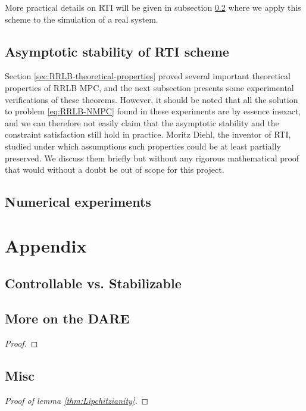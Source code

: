 \documentclass[12pt]{article}
\begin{document}
More practical details on RTI will be given in subsection \ref{sec:RRLB-numerical-experiments} where we apply this scheme to the simulation of a real system.

\subsection{Asymptotic stability of RTI scheme}\label{sec:RRLB-real-time-stability}

Section \ref{sec:RRLB-theoretical-properties} proved several important theoretical properties of RRLB MPC, and the next subsection presents some experimental verifications of these theorems.
However, it should be noted that all the solution to problem \ref{eq:RRLB-NMPC} found in these experiments are by essence inexact, and we can therefore not easily claim that the asymptotic stability and the constraint satisfaction still hold in practice.
Moritz Diehl, the inventor of RTI, studied under which assumptions such properties could be at least partially preserved.
We discuss them briefly but without any rigorous mathematical proof that would without a doubt be out of scope for this project.

\subsection{Numerical experiments}\label{sec:RRLB-numerical-experiments}

\newpage

\section{Appendix}
\printbibliography

\subsection*{Controllable vs. Stabilizable}\label{sec:controllability-stabilizability}

\subsection*{More on the DARE}\label{sec:DARE}

\begin{lemma}

\end{lemma}

\begin{proof}

\end{proof}

\subsection*{Misc}

\begin{proof}[Proof of lemma \ref{thm:Lipchitzianity}]

\end{proof}
\end{document}
